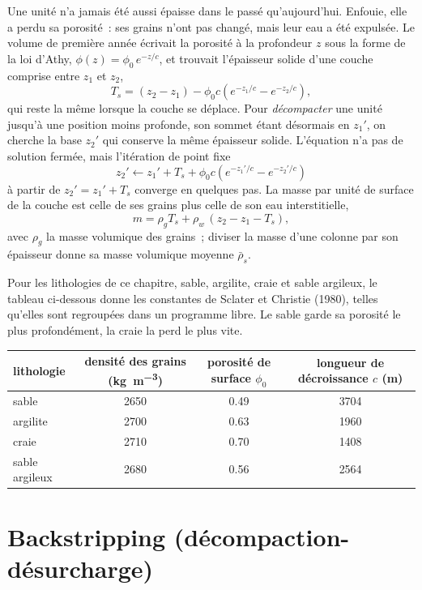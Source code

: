 Une unité n'a jamais été aussi épaisse dans le passé qu'aujourd'hui. Enfouie, elle a perdu sa porosité~: ses grains
n'ont pas changé, mais leur eau a été expulsée. Le volume de première année écrivait la porosité à la profondeur
$z$ sous la forme de la loi d'Athy, $\phi(z) = \phi_0\,e^{-z/c}$, et trouvait l'épaisseur solide d'une couche comprise entre
$z_1$ et $z_2$,
\[
  T_s = (z_2 - z_1) - \phi_0 c\left(e^{-z_1/c} - e^{-z_2/c}\right),
\]
qui reste la même lorsque la couche se déplace. Pour \emph{décompacter} une unité jusqu'à une position moins profonde,
son sommet étant désormais en $z_1'$, on cherche la base $z_2'$ qui conserve la même épaisseur solide. L'équation
n'a pas de solution fermée, mais l'itération de point fixe
\[
  z_2' \leftarrow z_1' + T_s + \phi_0 c\left(e^{-z_1'/c} - e^{-z_2'/c}\right)
\]
à partir de $z_2' = z_1' + T_s$ converge en quelques pas. La masse par unité de surface de la couche
est celle de ses grains plus celle de son eau interstitielle,
\[
  m = \rho_g T_s + \rho_w\,(z_2 - z_1 - T_s),
\]
avec $\rho_g$ la masse volumique des grains~; diviser la masse d'une colonne par son épaisseur donne
sa masse volumique moyenne $\bar\rho_s$.

Pour les lithologies de ce chapitre, sable, argilite, craie et sable argileux, le tableau ci-dessous donne
les constantes de Sclater et Christie (1980), telles qu'elles sont regroupées dans un programme libre. Le sable
garde sa porosité le plus profondément, la craie la perd le plus vite.

\begin{center}
\small
\begin{tabular}{lccc}
\hline
lithologie & densité des grains (\unit{kg.m^{-3}}) & porosité de surface $\phi_0$ & longueur de décroissance $c$ (\unit{m}) \\
\hline
sable & 2650 & 0.49 & 3704 \\
argilite & 2700 & 0.63 & 1960 \\
craie & 2710 & 0.70 & 1408 \\
sable argileux & 2680 & 0.56 & 2564 \\
\hline
\end{tabular}
\end{center}

\section{Backstripping (décompaction-désurcharge)}\label{sec:b2:basins-compared:backstripping}

